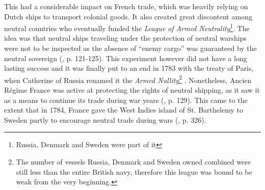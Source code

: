 \documentclass[12pt,a4paper,notitlepage,english]{article}
\begin{document}
This had a considerable impact on French trade, which was heavily relying on Dutch ships to transport colonial goods.
It also created great discontent among neutral countries who eventually funded the \textit{League of Armed Neutrality}\footnote{Russia, Denmark and Sweden were part of it}.
The idea was that neutral ships traveling under the protection of neutral warships were not to be inspected as the absence of ``enemy cargo'' was guaranteed by the neutral sovereign (\cite{Schnakenbourg2013}, p. 121-125).
This experiment however did not have a long lasting success and it was finally put to an end in 1783 with the treaty of Paris, when Catherine of Russia renamed it the \textit{Armed Nullity}\footnote{The number of vessels Russia, Denmark and Sweden owned combined were still less than the entire British navy, therefore this league was bound to be weak from the very beginning.} \citep{Griffiths1971}.
Nonetheless, Ancien Régime France was active at protecting the rights of neutral shipping, as it saw it as a means to continue its trade during war years (\cite{Schnakenbourg2013}, p. 129). This came to the extent that in 1784, France gave the West Indies island of St. Barthelemy to Sweden partly to encourage neutral trade during wars (\cite{Schnakenbourg2013}, p. 326).
\end{document}
